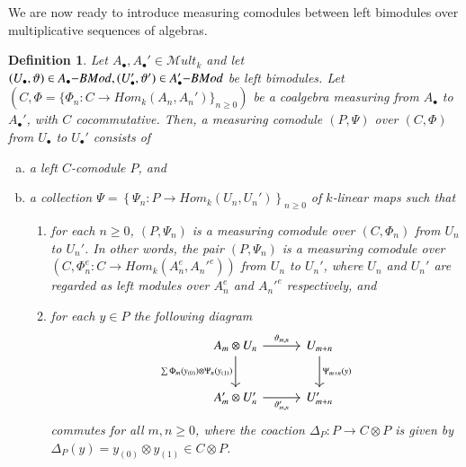 \documentclass[10pt, colorlinks]{article}
\numberwithin{equation}{section} \DeclareMathSizes{2}{10}{12}{13}
\newtheorem{defn}[thm]{Definition}
\begin{document}
 We are now ready  to introduce measuring comodules between left bimodules over multiplicative sequences of algebras.
 
\begin{defn}\label{defn5.8}
    Let $A_\bullet,A_\bullet'\in \mathscr Mult_k$ and let $(U_\bullet,\vartheta)\in A_\bullet{\small{-}}BMod,(U_\bullet',\vartheta')\in A'_\bullet{\small{-}}BMod$ be left bimodules. Let $(C,\Phi=\{\Phi_n:C\longrightarrow Hom_k(A_n,A_n')\}_{n\geq 0})$ be a coalgebra measuring from $A_\bullet$ to $A_\bullet'$, with $C$  cocommutative. Then, a measuring comodule $(P,\Psi)$ over $(C,\Phi)$ from $U_\bullet$ to $U_\bullet'$ consists of
    \begin{enumerate}[(a)]
        \item a left $C$-comodule $P$, and 
        \item a collection $\Psi=\left\{\Psi_n:P\longrightarrow  {Hom}_k(U_n,U_n')\right\}_{n\geq 0}$ of $k$-linear maps such that 
        \begin{enumerate}[(1)]
            \item for each $n\geq 0$, $(P,\Psi_n)$ is a measuring comodule over $(C,\Phi_n)$ from $U_n$ to $U_n'$. In other words, the pair $(P,\Psi_n)$ is a measuring comodule over $(C,\Phi_n^e: C\longrightarrow Hom_k(A_n^e,A_n'^e))$ from $U_n$ to $U_n'$, where $U_n$ and $U_n'$ are regarded as left modules over $A_n^e$ and $A_n'^e$ respectively, and
            \item  for each $y\in P$ the following diagram 
            \begin{equation}\label{diag5.10}
                \begin{tikzcd}[row sep=2.5em,  column sep=3em]
          A_m \otimes U_n
  \arrow[r, "\vartheta_{m,n}"]
  \arrow[d, "\sum \Phi_m(y_{(0)})\otimes\Psi_n(y_{(1)})"']
&
U_{m+n}
  \arrow[d, "\Psi_{m+n}(y)"]
\\
A'_{m}\otimes U'_n
  \arrow[r, "\vartheta'_{m,n}"']
&
U'_{m+n}
\end{tikzcd}
            \end{equation}
       commutes for all $m,n\geq 0$, where the coaction $\Delta_P:P\longrightarrow C\otimes P$ is given by $\Delta_P(y)=y_{(0)}\otimes y_{(1)}\in C\otimes P$.
        \end{enumerate}
    \end{enumerate}
\end{defn}
\smallskip 
\end{document}

